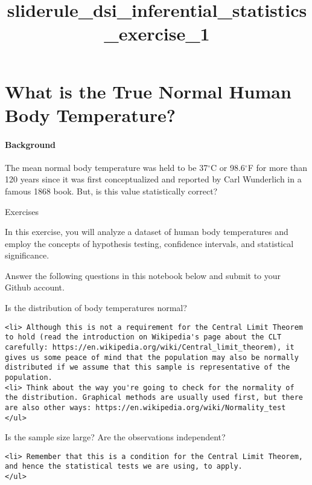 \documentclass[11pt]{article}
\title{sliderule\_dsi\_inferential\_statistics\_exercise\_1}
\begin{document}
    
    
    \maketitle
    
    

    
    \section{What is the True Normal Human Body
Temperature?}\label{what-is-the-true-normal-human-body-temperature}

    \paragraph{Background}\label{background}

The mean normal body temperature was held to be 37\(^{\circ}\)C or
98.6\(^{\circ}\)F for more than 120 years since it was first
conceptualized and reported by Carl Wunderlich in a famous 1868 book.
But, is this value statistically correct?

    Exercises

In this exercise, you will analyze a dataset of human body temperatures
and employ the concepts of hypothesis testing, confidence intervals, and
statistical significance.

Answer the following questions in this notebook below and submit to your
Github account.

Is the distribution of body temperatures normal?

\begin{verbatim}
<li> Although this is not a requirement for the Central Limit Theorem to hold (read the introduction on Wikipedia's page about the CLT carefully: https://en.wikipedia.org/wiki/Central_limit_theorem), it gives us some peace of mind that the population may also be normally distributed if we assume that this sample is representative of the population.
<li> Think about the way you're going to check for the normality of the distribution. Graphical methods are usually used first, but there are also other ways: https://en.wikipedia.org/wiki/Normality_test
</ul>
\end{verbatim}

Is the sample size large? Are the observations independent?

\begin{verbatim}
<li> Remember that this is a condition for the Central Limit Theorem, and hence the statistical tests we are using, to apply.
</ul>
\end{verbatim}
\end{document}
